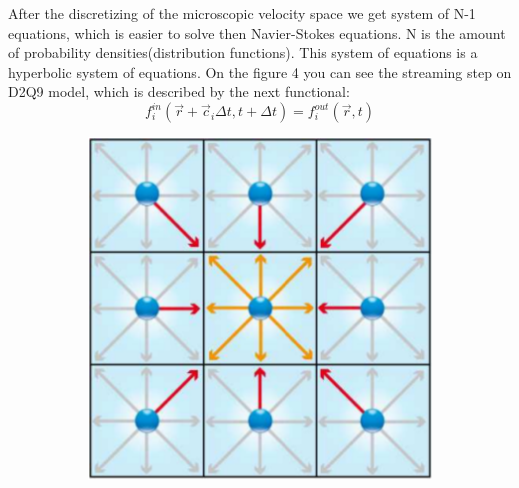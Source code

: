 After the discretizing of the microscopic velocity space we get system of N-1 equations, which is easier to solve then Navier-Stokes equations. N is the amount of probability densities(distribution functions). This system of equations is a hyperbolic system of equations. On the figure 4 you can see the streaming step on D2Q9 model, which is described by the next functional:
\begin{equation}
f_i^{in}(\vec{r}+\vec{c}_{i}\Delta t, t+\Delta t) = f_i^{out}(\vec{r}, t)
\end{equation}

\begin{figure}[H]
  \centering
  \begin{subfigure}[h]{0.3\textwidth}
    \includegraphics[width=\textwidth]{img/fig7-1.png}
  \end{subfigure}
  \begin{subfigure}[h]{0.3\textwidth}

\end{subfigure}
\end{figure}
